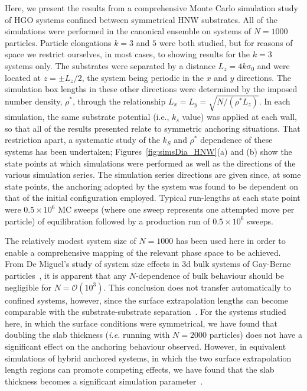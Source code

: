 \documentclass[aps,10pt,twocolumn]{revtex4}
\makeatletter
\newcommand{\so}{\sigma_0}
\newcommand{\ie}{\emph{i.e.}\@\xspace}
\makeatother
\begin{document}
Here, we present the results from a comprehensive Monte Carlo simulation study of HGO systems confined between
symmetrical HNW substrates. All of the simulations were performed in the canonical ensemble on systems of $N=1000$
particles. Particle elongations $k=3$ and $5$ were both studied, but for reasons of space we restrict ourselves,
in most cases, to showing results for the $k=3$ systems only. The substrates were separated by a distance
$L_z=4k\so$ and were located at $z=\pm L_z/2$, the system being periodic in the $x$ and $y$ directions. The
simulation box lengths in these other directions were determined by the imposed number density, $\rho^*$, through
the relationship $L_x=L_y=\sqrt{N/(\rho^{*}L_z)}$. In each simulation, the same substrate potential (i.e., $k_s$
value) was applied at each wall, so that all of the results presented relate to symmetric anchoring situations.
That restriction apart, a systematic study of the $k_S$ and $\rho^*$ dependence of these systems has been
undertaken; Figures~\ref{fig:simsDia_HNW}(a) and (b) show the state points at which simulations were performed as
well as the directions of the various simulation series. The simulation series directions are given since, at some
state points, the anchoring adopted by the system was found to be dependent on that of the initial configuration
employed. Typical run-lengths at each state point were $0.5\times 10^6$ MC sweeps (where one sweep represents one
attempted move per particle) of equilibration followed by a production run of $0.5\times 10^6$ sweeps.

The relatively modest system size of $N=1000$ has been used here in order to enable a comprehensive
mapping of the relevant phase space to be achieved. From De Miguel's study of system size effects in 3d bulk
systems of Gay-Berne particles~\cite{DeMiguel92}, it is apparent that any $N$-dependence of bulk behaviour should
be negligible for $N=\mathcal{O}(10^3)$. This conclusion does not transfer automatically to confined systems,
however, since the surface extrapolation lengths can become comparable with the substrate-substrate
separation~\cite{Priezjev03}. For the systems studied here, in which the surface conditions were symmetrical, we
have found that doubling the slab thickness (\ie running with $N=2000$ particles) does not have a significant
effect on the anchoring behaviour observed. However, in equivalent simulations of hybrid anchored systems, in
which the two surface extrapolation length regions can promote competing effects, we have found that the slab
thickness becomes a significant simulation parameter~\cite{fbThesis,BarmesCleaver04c}.
\end{document}
